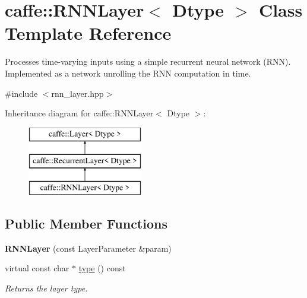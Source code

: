 \hypertarget{classcaffe_1_1RNNLayer}{}\section{caffe\+:\+:R\+N\+N\+Layer$<$ Dtype $>$ Class Template Reference}
\label{classcaffe_1_1RNNLayer}


Processes time-\/varying inputs using a simple recurrent neural network (R\+NN). Implemented as a network unrolling the R\+NN computation in time.  




{\ttfamily \#include $<$rnn\+\_\+layer.\+hpp$>$}

Inheritance diagram for caffe\+:\+:R\+N\+N\+Layer$<$ Dtype $>$\+:\begin{figure}[H]
\begin{center}
\leavevmode
\includegraphics[height=3.000000cm]{classcaffe_1_1RNNLayer}
\end{center}
\end{figure}
\subsection*{Public Member Functions}
\begin{DoxyCompactItemize}
\item 
{\bfseries R\+N\+N\+Layer} (const Layer\+Parameter \&param)\hypertarget{classcaffe_1_1RNNLayer_a2290c3f1738679a6196b86102ed08558}{}\label{classcaffe_1_1RNNLayer_a2290c3f1738679a6196b86102ed08558}

\item 
virtual const char $\ast$ \hyperlink{classcaffe_1_1RNNLayer_a8bee449c06ea3ba21c9fdcab15c15236}{type} () const \hypertarget{classcaffe_1_1RNNLayer_a8bee449c06ea3ba21c9fdcab15c15236}{}\label{classcaffe_1_1RNNLayer_a8bee449c06ea3ba21c9fdcab15c15236}

\begin{DoxyCompactList}\small\item\em Returns the layer type. \end{DoxyCompactList}\end{DoxyCompactItemize}
